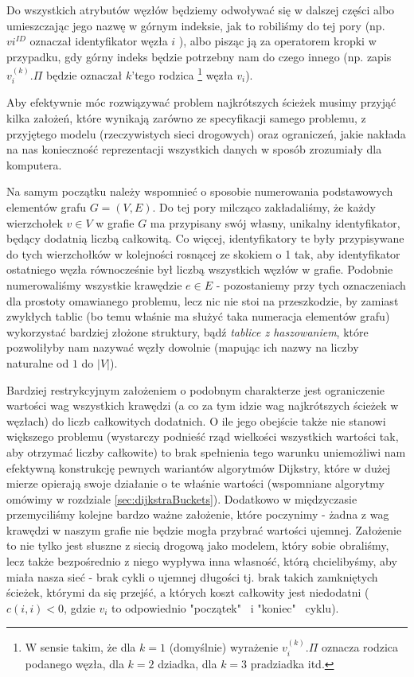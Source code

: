 Do wszystkich atrybutów węzłów będziemy odwoływać się w dalszej części albo umieszczając jego nazwę w górnym indeksie, jak to robiliśmy do tej pory (np. $v{i}^{ID}$ oznaczał identyfikator węzła $i$ ), albo pisząc ją za operatorem kropki w przypadku, gdy górny indeks będzie potrzebny nam do czego innego (np. zapis $v_{i}^{ \left( k \right) }.\Pi$ będzie oznaczał $k$'tego rodzica \footnote{W sensie takim, że dla $k=1$ (domyślnie) wyrażenie $v_{i}^{ \left( k \right) }.\Pi$ oznacza rodzica podanego węzła, dla $k=2$ dziadka, dla $k=3$ pradziadka itd.} węzła $v_{i}$).

Aby efektywnie móc rozwiązywać problem najkrótszych ścieżek musimy przyjąć kilka założeń, które wynikają zarówno ze specyfikacji samego problemu, z przyjętego modelu (rzeczywistych sieci drogowych) oraz ograniczeń, jakie nakłada na nas konieczność reprezentacji wszystkich danych w sposób zrozumiały dla komputera.

Na samym początku należy wspomnieć o sposobie numerowania podstawowych elementów grafu $G = \left( V, E \right)$. Do tej pory milcząco zakładaliśmy, że każdy wierzchołek $v \in V$ w grafie $G$ ma przypisany swój własny, unikalny identyfikator, będący dodatnią liczbą całkowitą. Co więcej, identyfikatory te były przypisywane do tych wierzchołków w kolejności rosnącej ze skokiem o 1 tak, aby identyfikator ostatniego węzła równocześnie był liczbą wszystkich węzłów w grafie. Podobnie numerowaliśmy wszystkie krawędzie $e \in E$ - pozostaniemy przy tych oznaczeniach dla prostoty omawianego problemu, lecz nic nie stoi na przeszkodzie, by zamiast zwykłych tablic (bo temu właśnie ma służyć taka numeracja elementów grafu) wykorzystać bardziej złożone struktury, bądź \textit{tablice z haszowaniem}, które pozwoliłyby nam nazywać węzły dowolnie (mapując ich nazwy na liczby naturalne od $1$ do $ \left| V \right| $).

Bardziej restrykcyjnym założeniem o podobnym charakterze jest ograniczenie wartości wag wszystkich krawędzi (a co za tym idzie wag najkrótszych ścieżek w węzłach) do liczb całkowitych dodatnich. O ile jego obejście także nie stanowi większego problemu (wystarczy podnieść rząd wielkości wszystkich wartości tak, aby otrzymać liczby całkowite) to brak spełnienia tego warunku uniemożliwi nam efektywną konstrukcję pewnych wariantów algorytmów Dijkstry, które w dużej mierze opierają swoje działanie o te właśnie wartości (wspomniane algorytmy omówimy w rozdziale \ref{sec:dijkstraBuckets}). Dodatkowo w międzyczasie przemyciliśmy kolejne bardzo ważne założenie, które poczynimy - żadna z wag krawędzi w naszym grafie nie będzie mogła przybrać wartości ujemnej. Założenie to nie tylko jest słuszne z siecią drogową jako modelem, który sobie obraliśmy, lecz także bezpośrednio z niego wypływa inna własność, którą chcielibyśmy, aby miała nasza sieć - brak cykli o ujemnej długości tj. brak takich zamkniętych ścieżek, którymi da się przejść, a których koszt całkowity jest niedodatni ($ c \left( i, i \right) < 0 $, gdzie $v_{i}$ to odpowiednio "początek"~ i "koniec"~ cyklu). 

